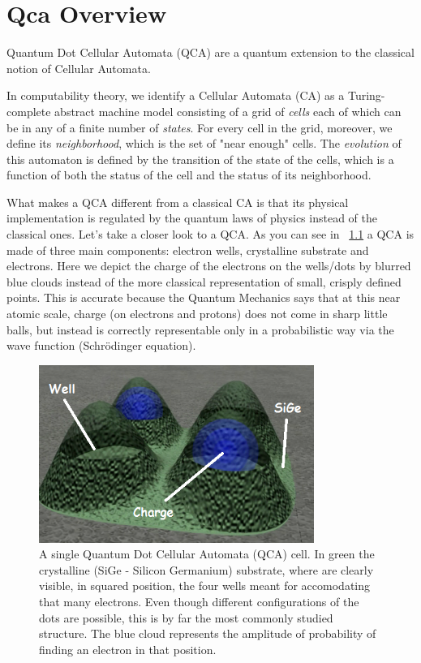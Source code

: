 \chapter{Qca Overview}\label{sec:qca}

Quantum Dot Cellular Automata (QCA) are a quantum extension to the classical notion of Cellular Automata. 

In computability theory, we identify a Cellular Automata (CA) as a Turing-complete abstract machine model consisting of a grid of \textsl{cells} each of which can be in any of a finite number of \textsl{states}. For every cell in the grid, moreover, we define its \textsl{neighborhood}, which is the set of "near enough" cells. The \textsl{evolution} of this automaton is defined by the transition of the state of the cells, which is a function of both the status of the cell and the status of its neighborhood.

What makes a QCA different from a classical CA is that its physical implementation is regulated by the quantum laws of physics instead of the classical ones. Let's take a closer look to a QCA. As you can see in \figurename~\ref{fig:qca} a QCA is made of three main components: electron wells, crystalline substrate and electrons. Here we depict the charge of the electrons on the wells/dots by blurred blue clouds instead of the more classical representation of small, crisply defined points. This is accurate because the Quantum Mechanics says that at this near atomic scale, charge (on electrons and protons) does not come in sharp little balls, but instead is correctly representable only in a probabilistic way via the wave function (Schr\"{o}dinger equation).

\begin{figure}[h!bt]
	\centerline{\includegraphics[width=0.8\textwidth]{img/qca.png}}
	\caption{A single Quantum Dot Cellular Automata (QCA) cell. In green the crystalline (SiGe - Silicon Germanium) substrate, where are clearly visible, in squared position, the four wells meant for accomodating that many electrons. Even though different configurations of the dots are possible, this is by far the most commonly studied structure. The blue cloud represents the amplitude of probability of finding an electron in that position.}
	\label{fig:qca}
\end{figure}

